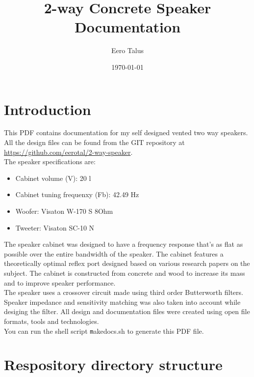 \documentclass[10pt]{article}
\title{2-way Concrete Speaker Documentation}
\author{Eero Talus}
\date{\today}
\begin{document}
\maketitle
\tableofcontents

\section{Introduction}

\noindent This PDF contains documentation for my self designed vented two way
speakers. All the design files can be found from the GIT repository at
\url{https://github.com/eerotal/2-way-speaker}.\\

\noindent The speaker specifications are:

\begin{itemize}
\item Cabinet volume (V): 20 l
\item Cabinet tuning frequenxy (Fb): 42.49 Hz
\item Woofer: Visaton W-170 S 8Ohm
\item Tweeter: Visaton SC-10 N
\end{itemize}

\noindent The speaker cabinet was designed to have a frequency response that's
as flat as possible over the entire bandwidth of the speaker. The cabinet
features a theoretically optimal reflex port designed based on various research
papers on the subject. The cabinet is constructed from concrete and wood to
increase its mass and to improve speaker performance.\\

\noindent The speaker uses a crossover circuit made using third order
Butterworth filters. Speaker impedance and sensitivity matching was also taken
into account while desiging the filter. All design and documentation files were
created using open file formats, tools and technologies.\\

\noindent You can run the shell script \texttt makedocs.sh to generate this
PDF file.

\section{Respository directory structure}
\end{document}
